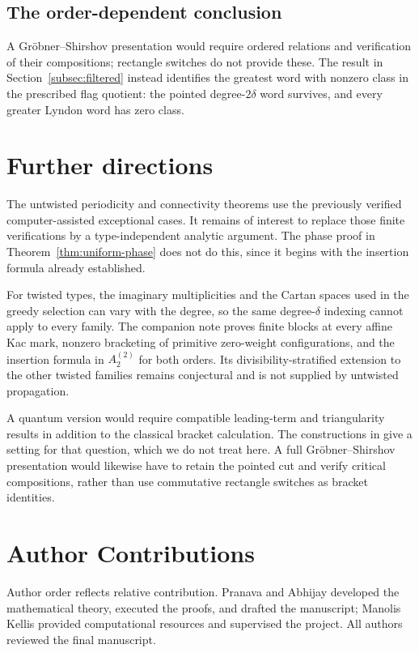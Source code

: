 \documentclass[11pt]{amsart}
\numberwithin{equation}{section}
\theoremstyle{definition}
\begin{document}
\subsection{The order-dependent conclusion}
A Gr\"obner--Shirshov presentation would require ordered relations and verification of their compositions; rectangle switches do not provide these. The result in Section~\ref{subsec:filtered} instead identifies the greatest word with nonzero class in the prescribed flag quotient: the pointed degree-$2\delta$ word survives, and every greater Lyndon word has zero class.

\section{Further directions}\label{sec:directions}

The untwisted periodicity and connectivity theorems use the previously verified computer-assisted exceptional cases. It remains of interest to replace those finite verifications by a type-independent analytic argument. The phase proof in Theorem~\ref{thm:uniform-phase} does not do this, since it begins with the insertion formula already established.

For twisted types, the imaginary multiplicities and the Cartan spaces used in the greedy selection can vary with the degree, so the same degree-$\delta$ indexing cannot apply to every family. The companion note proves finite blocks at every affine Kac mark, nonzero bracketing of primitive zero-weight configurations, and the insertion formula in $A_2^{(2)}$ for both orders. Its divisibility-stratified extension to the other twisted families remains conjectural and is not supplied by untwisted propagation.

A quantum version would require compatible leading-term and triangularity results in addition to the classical bracket calculation. The constructions in \cite{HT} give a setting for that question, which we do not treat here. A full Gr\"obner--Shirshov presentation would likewise have to retain the pointed cut and verify critical compositions, rather than use commutative rectangle switches as bracket identities.

\section*{Author Contributions}
Author order reflects relative contribution. Pranava and Abhijay developed the mathematical theory, executed the proofs, and drafted the manuscript; Manolis Kellis provided computational resources and supervised the project. All authors reviewed the final manuscript.
\end{document}

